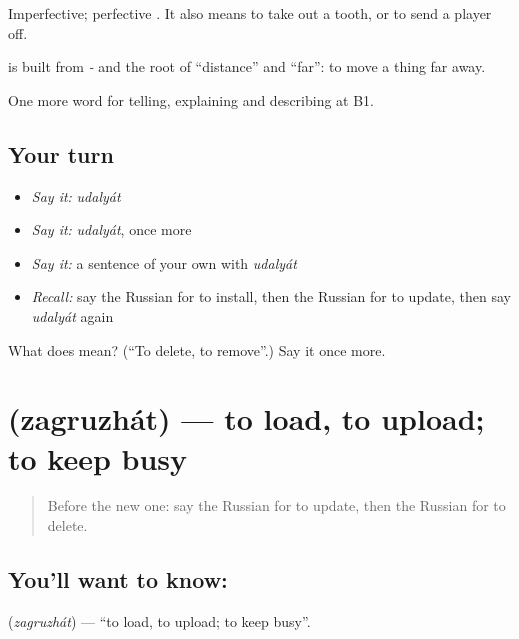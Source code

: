 Imperfective; perfective \emph{}. It also means to take out a tooth, or to send a player off.

\begin{cousinweb}
\textbf{} is built from \emph{-} and the root of \emph{} \textquotedblleft{}distance\textquotedblright{} and \emph{} \textquotedblleft{}far\textquotedblright{}: to move a thing far away.
\end{cousinweb}

\begin{grammarlens}[title={What you've built}]
One more word for telling, explaining and describing at B1.
\end{grammarlens}

\subsection*{Your turn}
\begin{itemize}
\raggedright
  \item \emph{Say it:} \emph{udalyát}
  \item \emph{Say it:} \emph{udalyát}, once more
  \item \emph{Say it:} a sentence of your own with \emph{udalyát}
  \item \emph{Recall:} say the Russian for to install, then the Russian for to update, then say \emph{udalyát} again
\end{itemize}

\begin{tcolorbox}[breakable,colback=teal!4,colframe=teal!35!black,title={Before you move on}]
What does  mean? (\textquotedblleft{}To delete, to remove\textquotedblright{}.) Say it once more.
\end{tcolorbox}
\section[\texorpdfstring{\ru{загружать} (zagruzhát)}{загружать (zagruzhát)}]{ (zagruzhát) — to load, to upload; to keep busy}

\label{lesson:RU-C401-zagruzhat}



\begin{quote}
Before the new one: say the Russian for to update, then the Russian for to delete.
\end{quote}

\subsection*{You'll want to know: }
\textbf{} (\emph{zagruzhát}) — \textquotedblleft{}to load, to upload; to keep busy\textquotedblright{}.

